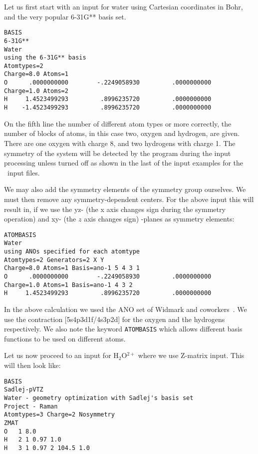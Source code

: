 Let us first start with an input for water using Cartesian coordinates
in Bohr, and the very popular 6-31G** basis set.

\begin{verbatim}
BASIS
6-31G**
Water
using the 6-31G** basis
Atomtypes=2
Charge=8.0 Atoms=1
O      .0000000000        -.2249058930         .0000000000
Charge=1.0 Atoms=2
H     1.4523499293         .8996235720         .0000000000
H    -1.4523499293         .8996235720         .0000000000
\end{verbatim}

On the fifth line the number of different atom types or more correctly,
the number of  blocks of atoms,
in this case two, oxygen and hydrogen, are given. There are one oxygen with
charge 8, and two hydrogens with charge 1. The symmetry of the system
will be detected by the program during the input processing unless
turned off as shown in the last of the input examples for the \molinp\
input files.

We may also add the symmetry elements of the
symmetry group\index{symmetry!group} ourselves. We must
then remove any symmetry-dependent centers. For the above input this
will result in, if we use the yz- (the x axis changes sign during the
symmetry operation) and xy- (the $z$ axis changes sign) -planes as
symmetry elements: 

\begin{verbatim}
ATOMBASIS
Water
using ANOs specified for each atomtype
Atomtypes=2 Generators=2 X Y
Charge=8.0 Atoms=1 Basis=ano-1 5 4 3 1
O      .0000000000        -.2249058930         .0000000000
Charge=1.0 Atoms=1 Basis=ano-1 4 3 2
H     1.4523499293         .8996235720         .0000000000
\end{verbatim}

In the above calculation we used the ANO set of
Widmark and
coworkers~\cite{powpambortca77,powbjpbortca79}. We
use the contraction
[5s4p3d1f/4s3p2d] for the oxygen and the hydrogens respectively. We
also note the keyword \verb|ATOMBASIS|\index{ATOMBASIS} which allows
different basis functions to be used on different atoms.

Let us now proceed to an input for H$_{2}$O$^{2+}$ where we use
Z-matrix input. This will then look like:

\begin{verbatim}
BASIS
Sadlej-pVTZ
Water - geometry optimization with Sadlej's basis set
Project - Raman
Atomtypes=3 Charge=2 Nosymmetry
ZMAT
O   1 8.0
H   2 1 0.97 1.0
H   3 1 0.97 2 104.5 1.0
\end{verbatim}

